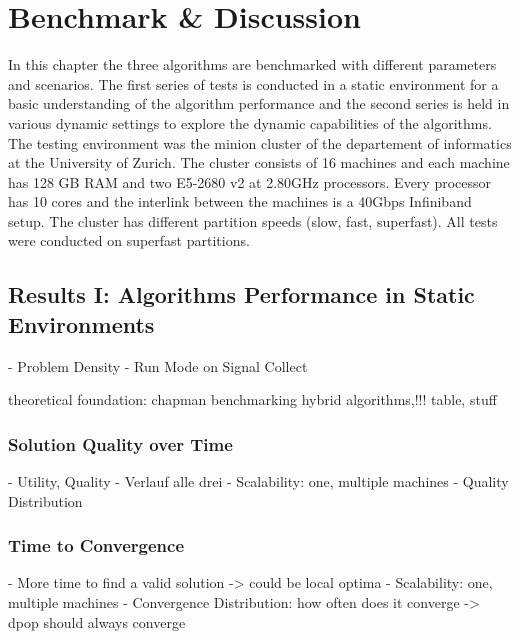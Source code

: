 \chapter{Benchmark \& Discussion}

In this chapter the three algorithms are benchmarked with different parameters and scenarios. The first series of tests is conducted in a static environment for a basic understanding of the algorithm performance and the second series is held in various dynamic settings to explore the dynamic capabilities of the algorithms. The testing environment was the minion cluster of the departement of informatics at the University of Zurich. The cluster consists of 16 machines and each machine has 128 GB RAM and two E5-2680 v2 at 2.80GHz processors. Every processor has 10 cores and the interlink between the machines is a 40Gbps Infiniband setup. The cluster has different partition speeds (slow, fast, superfast). All tests were conducted on superfast partitions.

\section{Results I: Algorithms Performance in Static Environments}

- Problem Density
- Run Mode on Signal Collect

theoretical foundation: chapman benchmarking hybrid algorithms,!!! table, stuff

\subsection{Solution Quality over Time}
- Utility, Quality
- Verlauf alle drei
- Scalability: one, multiple machines
- Quality Distribution

\subsection{Time to Convergence}
- More time to find a valid solution -> could be local optima
- Scalability: one, multiple machines
- Convergence Distribution: how often does it converge -> dpop should always converge


